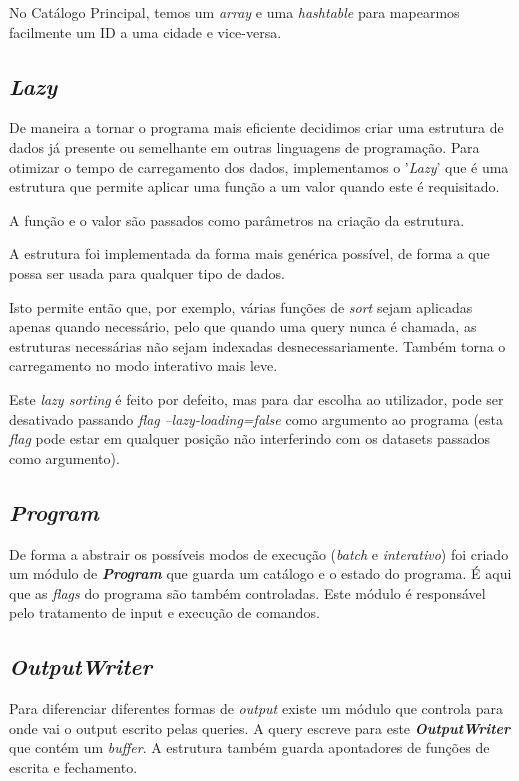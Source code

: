 \documentclass{article}
\begin{document}
            No Catálogo Principal, temos um \textit{array} e uma \textit{hashtable} para mapearmos facilmente um ID a uma cidade e vice-versa.       
            
        \subsection{\emph{Lazy}}
            De maneira a tornar o programa mais eficiente decidimos criar uma
            estrutura de dados já presente ou semelhante em outras linguagens de programação.
            Para otimizar o tempo de carregamento dos dados, implementamos o '\emph{Lazy}' que é uma
            estrutura que permite aplicar uma função a um valor quando este é requisitado.

            A função e o valor são passados como parâmetros na criação da estrutura.

            A estrutura foi implementada da forma mais genérica possível, de forma a que
            possa ser usada para qualquer tipo de dados.

            Isto permite então que, por exemplo, várias funções de \emph{sort} sejam aplicadas
            apenas quando necessário, pelo que quando uma query nunca é chamada, as estruturas necessárias
            não sejam indexadas desnecessariamente. Também torna o carregamento no modo interativo
            mais leve. 

            Este \emph{lazy sorting} é feito por defeito, mas para dar escolha ao utilizador,
            pode ser desativado passando \emph{flag} \emph{--lazy-loading=false}
            como argumento ao programa (esta \emph{flag} pode estar em qualquer
            posição não interferindo com os datasets passados como argumento).
        \subsection{\emph{Program}}
            De forma a abstrair os possíveis modos de execução (\textit{batch} e \textit{interativo})
            foi criado um módulo de \textit{\textbf{Program}} que guarda um catálogo e o estado do programa.
            É aqui que as \textit{flags} do programa são também controladas.
            Este módulo é responsável pelo tratamento de input e execução de comandos.
        \subsection{\emph{OutputWriter}}
            Para diferenciar diferentes formas de \textit{output} existe um módulo que controla
            para onde vai o output escrito pelas queries. A query escreve para este \textit{\textbf{OutputWriter}} que
            contém um \textit{buffer}. A estrutura também guarda apontadores de funções de escrita e fechamento.
            
\end{document}
